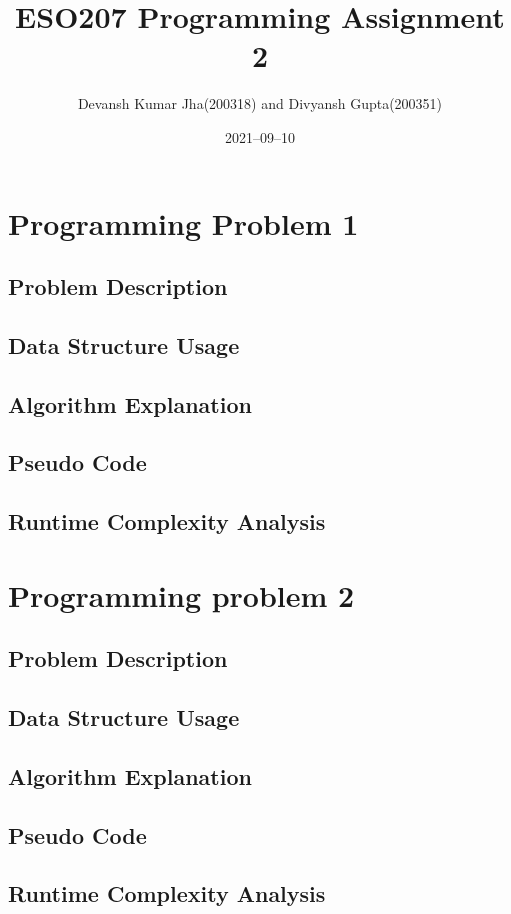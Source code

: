 \documentclass[20pt]{article}
\title{ESO207 Programming Assignment 2}
\author{Devansh Kumar Jha(200318) and Divyansh Gupta(200351)}
\date{2021–09–10}
\begin{document}
\maketitle


\section{Programming Problem 1}

\subsection{Problem Description}

\subsection{Data Structure Usage}


\subsection{Algorithm Explanation}


\subsection{Pseudo Code}

\subsection{Runtime Complexity Analysis}

\newpage
\section{Programming problem 2}


\subsection{Problem Description}

\subsection{Data Structure Usage}


\subsection{Algorithm Explanation}

\subsection{Pseudo Code}

\subsection{Runtime Complexity Analysis}
\end{document}
